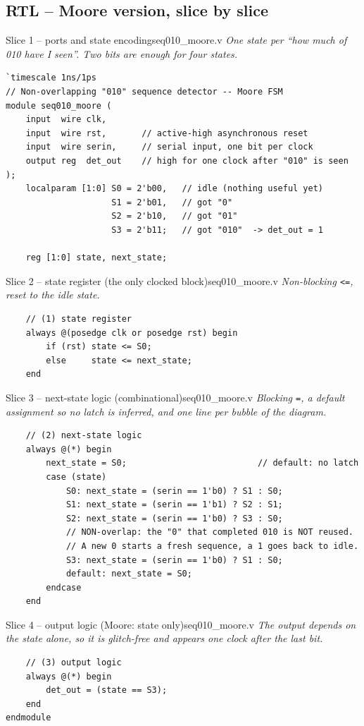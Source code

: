 \documentclass[10pt,a4paper]{article}
\newcommand{\slicenote}[1]{{\small\color{black!70}\itshape #1}\par\smallskip}
\begin{document}
\subsection{RTL -- Moore version, slice by slice}
\begin{codeslice}{Slice 1 -- ports and state encoding}{seq010\_moore.v}
\slicenote{One state per ``how much of 010 have I seen''. Two bits are enough for four states.}
\begin{lstlisting}
`timescale 1ns/1ps
// Non-overlapping "010" sequence detector -- Moore FSM
module seq010_moore (
    input  wire clk,
    input  wire rst,       // active-high asynchronous reset
    input  wire serin,     // serial input, one bit per clock
    output reg  det_out    // high for one clock after "010" is seen
);
    localparam [1:0] S0 = 2'b00,   // idle (nothing useful yet)
                     S1 = 2'b01,   // got "0"
                     S2 = 2'b10,   // got "01"
                     S3 = 2'b11;   // got "010"  -> det_out = 1

    reg [1:0] state, next_state;
\end{lstlisting}
\end{codeslice}
\begin{codeslice}{Slice 2 -- state register (the only clocked block)}{seq010\_moore.v}
\slicenote{Non-blocking \texttt{<=}, reset to the idle state.}
\begin{lstlisting}
    // (1) state register
    always @(posedge clk or posedge rst) begin
        if (rst) state <= S0;
        else     state <= next_state;
    end
\end{lstlisting}
\end{codeslice}
\begin{codeslice}{Slice 3 -- next-state logic (combinational)}{seq010\_moore.v}
\slicenote{Blocking \texttt{=}, a default assignment so no latch is inferred, and one line per bubble of the diagram.}
\begin{lstlisting}
    // (2) next-state logic
    always @(*) begin
        next_state = S0;                          // default: no latch
        case (state)
            S0: next_state = (serin == 1'b0) ? S1 : S0;
            S1: next_state = (serin == 1'b1) ? S2 : S1;
            S2: next_state = (serin == 1'b0) ? S3 : S0;
            // NON-overlap: the "0" that completed 010 is NOT reused.
            // A new 0 starts a fresh sequence, a 1 goes back to idle.
            S3: next_state = (serin == 1'b0) ? S1 : S0;
            default: next_state = S0;
        endcase
    end
\end{lstlisting}
\end{codeslice}
\begin{codeslice}{Slice 4 -- output logic (Moore: state only)}{seq010\_moore.v}
\slicenote{The output depends on the state alone, so it is glitch-free and appears one clock after the last bit.}
\begin{lstlisting}
    // (3) output logic
    always @(*) begin
        det_out = (state == S3);
    end
endmodule
\end{lstlisting}
\end{codeslice}
\end{document}
